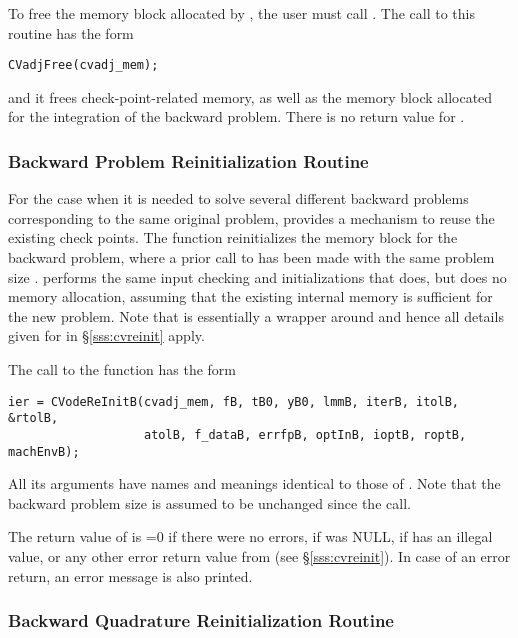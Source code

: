 To free the  memory block allocated by , the
user must call . The call to this routine has the form
\begin{verbatim}
CVadjFree(cvadj_mem);
\end{verbatim}
and it frees check-point-related memory, as well as the {\cvodes} memory block
allocated for the integration of the backward problem. There is no return 
value for .

\subsubsection{Backward Problem Reinitialization Routine}\label{sss:cvreinitb}

For the case when it is needed to solve several different backward problems 
corresponding to the same original problem, {\cvodes} provides a mechanism 
to reuse the existing check points. The function  reinitializes
the {\cvodes} memory block for the backward problem, where a prior call to
 has been made with the same problem size .
 performs the same input checking and initializations that 
 does, but does no memory allocation, 
assuming that the existing internal memory is sufficient for the new problem. 
Note that  is essentially a wrapper around 
and hence all details given for  in \S\ref{sss:cvreinit}
apply.

The call to the  function has the form
\begin{verbatim}
ier = CVodeReInitB(cvadj_mem, fB, tB0, yB0, lmmB, iterB, itolB, &rtolB, 
                   atolB, f_dataB, errfpB, optInB, ioptB, roptB, machEnvB);
\end{verbatim}
All its arguments  have names and meanings identical to those of .
Note that the backward problem size  is assumed to be unchanged since 
the  call.

The return value  of  is  
=0 if there were no errors,
 if  was NULL,
 if  has an illegal value,
or any other error return value from  (see \S\ref{sss:cvreinit}).
In case of an error return, an error message is also printed.  

\subsubsection{Backward Quadrature Reinitialization Routine}\label{sss:cvodequadreinitb}

